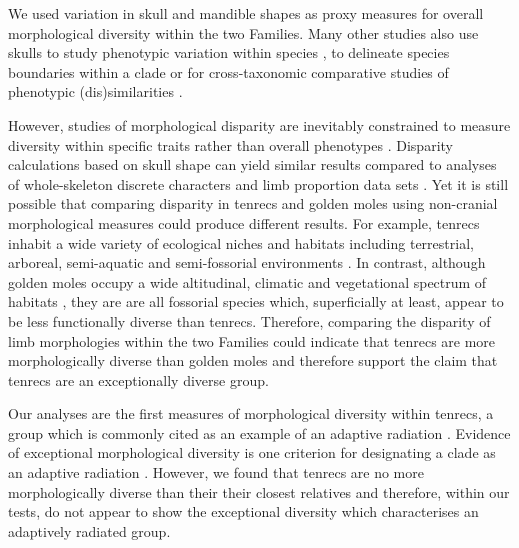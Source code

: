 \documentclass[12pt,a4paper]{article}
\begin{document}
	We used variation in skull and mandible shapes as proxy measures for overall morphological diversity within the two Families. Many other studies also use skulls to study phenotypic variation within species \citep{Blagojevic2011, Bornholdt2008}, to delineate species boundaries within a clade \citep[e.g.][]{Panchetti2008} or for cross-taxonomic comparative studies of phenotypic (dis)similarities \citep[e.g.][]{Ruta2013, Goswami2011, Wroe2007}.
	
	However, studies of morphological disparity are inevitably constrained to measure diversity within specific traits rather than overall phenotypes \citep{Roy1997}. Disparity calculations based on skull shape can yield similar results compared to analyses of whole-skeleton discrete characters and limb proportion data sets \citep{Foth2012}. Yet it is still possible that comparing disparity in tenrecs and golden moles using non-cranial morphological measures could produce different results. For example, tenrecs inhabit a wide variety of ecological niches and habitats including terrestrial, arboreal, semi-aquatic and semi-fossorial environments \citep{Soarimalala2011}. In contrast, although golden moles occupy a wide altitudinal, climatic and vegetational spectrum of habitats \citep{Bronner1995}, they are are all fossorial species which, superficially at least, appear to be less functionally diverse than tenrecs. Therefore, comparing the disparity of limb morphologies within the two Families could indicate that tenrecs are more morphologically diverse than golden moles and therefore support the claim that tenrecs are an exceptionally diverse group. 
	
	

 	Our analyses are the first measures of morphological diversity within tenrecs, a group which is commonly cited as an example of an adaptive radiation \citep{Olson2013}. Evidence of exceptional morphological diversity is one criterion for designating a clade as an adaptive radiation \citep{Losos2010a}. However, we found that tenrecs are no more morphologically diverse than their their closest relatives and therefore, within our tests, do not appear to show the exceptional diversity which characterises an adaptively radiated group.   
 	
\end{document}
